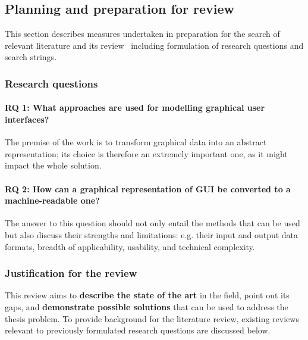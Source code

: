 \subsection[Planning and preparation]{Planning and preparation for review}\label{subsec:planning-and-preparation-for-review}

This section describes measures undertaken in preparation for the search of relevant literature and its review \textendash\ including formulation of research questions and search strings.

\subsubsection{Research questions}


\paragraph{RQ 1: What approaches are used for modelling graphical user interfaces?}
The premise of the work is to transform graphical data into an abstract representation;
its choice is therefore an extremely important one, as it might impact the whole solution.

\paragraph{RQ 2: How can a graphical representation of GUI be converted to a machine-readable one?}
The answer to this question should not only entail the methods that can be used but also discuss their strengths and limitations: e.g. their input and output data formats, breadth of applicability, usability, and technical complexity.

\subsubsection[Justification]{Justification for the review}

This review aims to \textbf{describe the state of the art} in the field, point out its gaps, and \textbf{demonstrate possible solutions} that can be used to address the thesis problem.
To provide background for the literature review, existing reviews
relevant to previously formulated research questions are discussed below.


